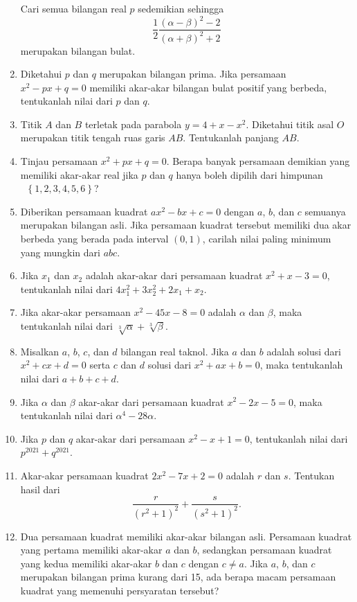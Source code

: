\documentclass[12pt]{article}
\newcommand*\lrbr[1]{\mathop{}\!\left\lbrace#1\right\rbrace}
\begin{document}
\begin{enumerate}[leftmargin=*]
		Cari semua bilangan real $ p $ sedemikian sehingga
		\[ \frac{1}{2}\frac{\left(\alpha - \beta\right)^{2} - 2}{\left(\alpha + \beta\right)^{2} + 2} \]
		merupakan bilangan bulat.
		\item Diketahui $ p $ dan $ q $ merupakan bilangan prima. Jika persamaan $ x^{2} - px + q = 0 $ memiliki akar-akar bilangan bulat positif yang berbeda, tentukanlah nilai dari $ p $ dan $ q $.
		\item Titik $ A $ dan $ B $ terletak pada parabola $ y = 4 + x - x^{2} $. Diketahui titik asal $ O $ merupakan titik tengah ruas garis $ AB $. Tentukanlah panjang $ AB $.
		\item Tinjau persamaan $ x^{2} + px + q = 0 $. Berapa banyak persamaan demikian yang memiliki akar-akar real jika $ p $ dan $ q $ hanya boleh dipilih dari himpunan $ \lrbr{1, 2, 3, 4, 5, 6} $?
		\item Diberikan persamaan kuadrat $ ax^{2} - bx + c = 0 $ dengan $ a $, $ b $, dan $ c $ semuanya merupakan bilangan asli. Jika persamaan kuadrat tersebut memiliki dua akar berbeda yang berada pada interval $ \left(0, 1\right) $, carilah nilai paling minimum yang mungkin dari $ abc $.
		\item Jika $ x_{1} $ dan $ x_{2} $ adalah akar-akar dari persamaan kuadrat $ x^{2} + x - 3 = 0 $, tentukanlah nilai dari $ 4x_{1}^{2} + 3x_{2}^{2} + 2x_{1} + x_{2} $.
		\item Jika akar-akar persamaan $ x^{2} - 45x - 8 = 0 $ adalah $ \alpha $ dan $ \beta $, maka tentukanlah nilai dari $ \sqrt[3]{\alpha} + \sqrt[3]{\beta} $.
		\item Misalkan $ a $, $ b $, $ c $, dan $ d $ bilangan real taknol. Jika $ a $ dan $ b $ adalah solusi dari $ x^{2} + cx + d = 0 $ serta $ c $ dan $ d $ solusi dari $ x^{2} + ax + b = 0 $, maka tentukanlah nilai dari $ a + b + c + d $.
		\item Jika $ \alpha $ dan $ \beta $ akar-akar dari persamaan kuadrat $ x^{2} - 2x - 5 = 0 $, maka tentukanlah nilai dari $ \alpha^{4} - 28\alpha $.
		\item Jika $ p $ dan $ q $ akar-akar dari persamaan $ x^{2} - x + 1 = 0 $, tentukanlah nilai dari $ p^{2021} + q^{2021} $.
		\item Akar-akar persamaan kuadrat $ 2x^{2} - 7x + 2 = 0 $ adalah $ r $ dan $ s $. Tentukan hasil dari
		\[ \frac{r}{\left(r^{2} + 1\right)^{2}} + \frac{s}{\left(s^{2} + 1\right)^{2}}. \]
		\item Dua persamaan kuadrat memiliki akar-akar bilangan asli. Persamaan kuadrat yang pertama memiliki akar-akar $ a $ dan $ b $, sedangkan persamaan kuadrat yang kedua memiliki akar-akar $ b $ dan $ c $ dengan $ c \ne a $. Jika $ a $, $ b $, dan $ c $ merupakan bilangan prima kurang dari 15, ada berapa macam persamaan kuadrat yang memenuhi persyaratan tersebut?

\end{enumerate}
\end{document}
